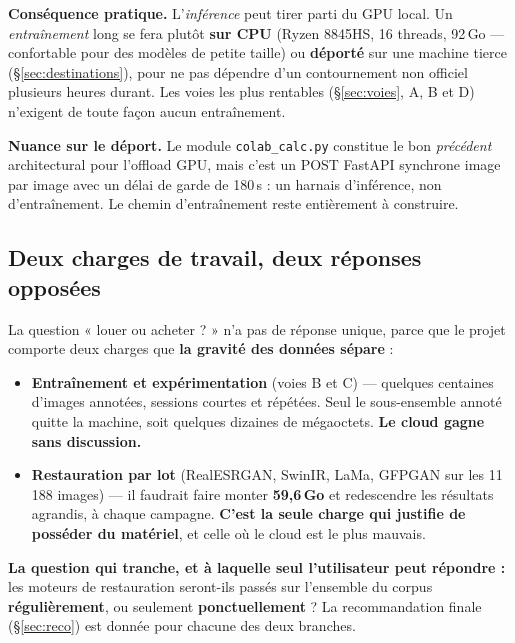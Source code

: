 \documentclass[11pt,a4paper]{article}
\newcommand{\aretenir}[1]{%
  \par\medskip
  \noindent\colorbox{encadre}{%
    \begin{minipage}{\dimexpr\linewidth-2\fboxsep}
      \vspace{2pt}#1\vspace{2pt}
    \end{minipage}}%
  \par\medskip
}
\newcommand{\alerte}[1]{\textcolor{alerte}{\textbf{#1}}}
\begin{document}
\aretenir{\textbf{Conséquence pratique.} L'\emph{inférence} peut tirer parti du
GPU local. Un \emph{entraînement} long se fera plutôt \textbf{sur CPU} (Ryzen
8845HS, 16 threads, 92\,Go — confortable pour des modèles de petite taille) ou
\textbf{déporté} sur une machine tierce (§\ref{sec:destinations}), pour ne pas
dépendre d'un contournement non officiel plusieurs heures durant. Les voies les
plus rentables (§\ref{sec:voies}, A, B et D) n'exigent de toute façon aucun
entraînement.}

\textbf{Nuance sur le déport.} Le module \texttt{colab\_calc.py} constitue le bon
\emph{précédent} architectural pour l'offload GPU, mais c'est un POST FastAPI
synchrone image par image avec un délai de garde de 180\,s : un harnais
d'inférence, non d'entraînement. Le chemin d'entraînement reste entièrement à
construire.

\subsection{Deux charges de travail, deux réponses opposées}
\label{sec:charges}

La question « louer ou acheter ? » n'a pas de réponse unique, parce que le projet
comporte deux charges que \textbf{la gravité des données sépare} :

\begin{itemize}[leftmargin=*,itemsep=4pt]
  \item \textbf{Entraînement et expérimentation} (voies B et C) — quelques
  centaines d'images annotées, sessions courtes et répétées. Seul le
  sous-ensemble annoté quitte la machine, soit quelques dizaines de mégaoctets.
  \alerte{Le cloud gagne sans discussion.}
  \item \textbf{Restauration par lot} (RealESRGAN, SwinIR, LaMa, GFPGAN sur les
  11\,188 images) — il faudrait faire monter \textbf{59,6\,Go} et redescendre les
  résultats agrandis, à chaque campagne. \alerte{C'est la seule charge qui
  justifie de posséder du matériel}, et celle où le cloud est le plus mauvais.
\end{itemize}

\aretenir{\textbf{La question qui tranche, et à laquelle seul l'utilisateur peut
répondre :} les moteurs de restauration seront-ils passés sur l'ensemble du
corpus \textbf{régulièrement}, ou seulement \textbf{ponctuellement} ? La
recommandation finale (§\ref{sec:reco}) est donnée pour chacune des deux
branches.}
\end{document}
